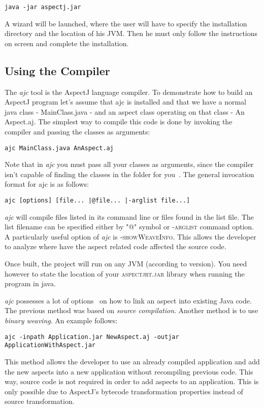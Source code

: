 \documentclass{template}
\begin{document}
\verb!java -jar aspectj.jar!

A wizard will be launched, where the user will have to specify the installation directory and the location of his JVM. Then he must only follow the instructions on screen and complete the installation.

\subsection{Using the Compiler}

The \textit{ajc} tool is the AspectJ language compiler. To demonstrate how to build an AspectJ program let's assume that ajc is installed and that we have a normal java class - MainClass.java - and an aspect class operating on that class - An Aspect.aj. The simplest way to compile this code is done by invoking the compiler and passing the classes as arguments:

\verb!ajc MainClass.java AnAspect.aj!

Note that in \textit{ajc} you must pass all your classes as arguments, since the compiler isn't capable of finding the classes in the folder for you~\cite{ajcsite}. The general invocation format for ajc is as follows: 

\verb!ajc [options] [file... |@file... |-arglist file...]!

\textit{ajc} will compile files listed in its command line or files found in the list file. The list filename can be specified 
either by "@" symbol or \textsc{-arglist} command option. A particularly useful option of \textit{ajc} is \textsc{-showWeaveInfo}. This allows the developer to analyze where have the aspect related code affected the source code. 

Once built, the project will run on any JVM (according to version). You need however to state the location of your \textsc{aspectjrt.jar} library when running the program in java.

\textit{ajc} possesses a lot of options~\cite{ajcsite} on how to link an aspect into existing Java code. The previous method was based on \textit{source compilation}. Another method is to use \textit{binary weaving}. An example follows:

\verb!ajc -inpath Application.jar NewAspect.aj -outjar ApplicationWithAspect.jar!

This method allows the developer to use an already compiled application and add the new aspects into a new application without recompiling previous code. This way, source code is not required in order to add aspects to an application. This is only possible due to AspectJ's bytecode transformation properties instead of source transformation.
\end{document}
